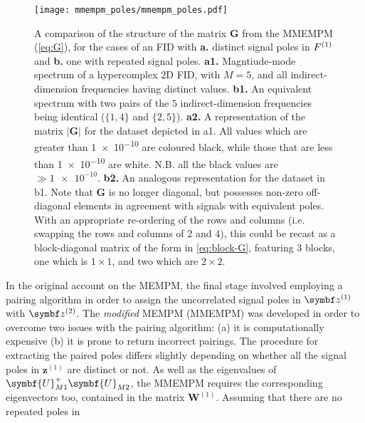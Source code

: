\begin{figure}
    \centering
    \texttt{[image: mmempm\_poles/mmempm\_poles.pdf]}
    \caption[
        A comparison of the structure of the matrix $\symbf{G}$ from the
        \acs{MMEMPM}, for the cases of an \acs{FID} with distinct signal poles
        in $\Fone$ and one with repeated signal poles
    ]{
        A comparison of the structure of the matrix $\symbf{G}$ from the
        \acs{MMEMPM} (\cref{eq:G}), for the cases of an \acs{FID} with \textbf{a.} distinct
        signal poles in $\Fone$ and \textbf{b.} one with repeated signal poles.
        \textbf{a1.} Magntiude-mode spectrum of a hypercomplex \ac{2D}
        \ac{FID}, with $M=5$, and all indirect-dimension frequencies having
        distinct values.
        \textbf{b1.} An equivalent spectrum with two pairs of the $5$
        indirect-dimension frequencies being identical ($\lbrace 1, 4 \rbrace$
        and  $\lbrace 2, 5 \rbrace$).
        \textbf{a2.} A representation of the matrix
        $\lvert \symbf{G} \rvert$ for the dataset depicted in a1. All values
        which are greater than \num{1e-10} are coloured black, while those that
        are less than \num{1e-10} are white. N.B. all the black values are $\gg
        \num{1e-10}$.
        \textbf{b2.} An analogous representation for the dataset in b1. Note
        that $\symbf{G}$ is no longer diagonal, but possesses non-zero
        off-diagonal elements in agreement with signals with equivalent poles.
        With an appropriate re-ordering of the rows and columns (i.e. swapping
        the rows and columns of 2 and 4), this could be recast as a
        block-diagonal matrix of the form in \cref{eq:block-G}, featuring 3
        blocks, one which is $1 \times 1$, and two which are  $2 \times 2$.
    }
    \label{fig:mmempm-poles}
\end{figure}
In the original account on the \ac{MEMPM}, the final stage involved employing a
pairing algorithm in order to assign the uncorrelated signal poles in $\bdzone$
with $\bdztwo$\cite{Hua1992}. The \emph{modified} \ac{MEMPM} (\acs{MMEMPM}) was
developed in order to overcome two issues with the pairing algorithm: (a) it is
computationally expensive (b) it is prone to return incorrect
pairings\cite{Chen2007}.
The procedure for extracting the paired poles differs slightly depending on
whether all the signal poles in $\symbf{z}^{(1)}$ are distinct or not.
As well as the eigenvalues of
$\symbf{U}^{+}_{M1}\symbf{U}_{M2}^{\vphantom{+}}$, the \ac{MMEMPM} requires
the corresponding eigenvectors too, contained in the matrix
$\symbf{W}^{(1)}$. Assuming that there are no repeated poles in
